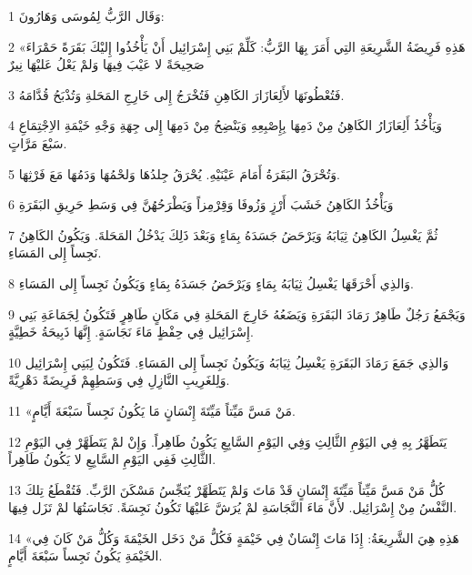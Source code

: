 \par 1 وَقَال الرَّبُّ لِمُوسَى وَهَارُونَ:
\par 2 «هَذِهِ فَرِيضَةُ الشَّرِيعَةِ التِي أَمَرَ بِهَا الرَّبُّ: كَلِّمْ بَنِي إِسْرَائِيل أَنْ يَأْخُذُوا إِليْكَ بَقَرَةً حَمْرَاءَ صَحِيحَةً لا عَيْبَ فِيهَا وَلمْ يَعْلُ عَليْهَا نِيرٌ
\par 3 فَتُعْطُونَهَا لأَلِعَازَارَ الكَاهِنِ فَتُخْرَجُ إِلى خَارِجِ المَحَلةِ وَتُذْبَحُ قُدَّامَهُ.
\par 4 وَيَأْخُذُ أَلِعَازَارُ الكَاهِنُ مِنْ دَمِهَا بِإِصْبِعِهِ وَيَنْضِحُ مِنْ دَمِهَا إِلى جِهَةِ وَجْهِ خَيْمَةِ الاِجْتِمَاعِ سَبْعَ مَرَّاتٍ.
\par 5 وَتُحْرَقُ البَقَرَةُ أَمَامَ عَيْنَيْهِ. يُحْرَقُ جِلدُهَا وَلحْمُهَا وَدَمُهَا مَعَ فَرْثِهَا.
\par 6 وَيَأْخُذُ الكَاهِنُ خَشَبَ أَرْزٍ وَزُوفَا وَقِرْمِزاً وَيَطْرَحُهُنَّ فِي وَسَطِ حَرِيقِ البَقَرَةِ
\par 7 ثُمَّ يَغْسِلُ الكَاهِنُ ثِيَابَهُ وَيَرْحَضُ جَسَدَهُ بِمَاءٍ وَبَعْدَ ذَلِكَ يَدْخُلُ المَحَلةَ. وَيَكُونُ الكَاهِنُ نَجِساً إِلى المَسَاءِ.
\par 8 وَالذِي أَحْرَقَهَا يَغْسِلُ ثِيَابَهُ بِمَاءٍ وَيَرْحَضُ جَسَدَهُ بِمَاءٍ وَيَكُونُ نَجِساً إِلى المَسَاءِ.
\par 9 وَيَجْمَعُ رَجُلٌ طَاهِرٌ رَمَادَ البَقَرَةِ وَيَضَعُهُ خَارِجَ المَحَلةِ فِي مَكَانٍ طَاهِرٍ فَتَكُونُ لِجَمَاعَةِ بَنِي إِسْرَائِيل فِي حِفْظٍ مَاءَ نَجَاسَةٍ. إِنَّهَا ذَبِيحَةُ خَطِيَّةٍ.
\par 10 وَالذِي جَمَعَ رَمَادَ البَقَرَةِ يَغْسِلُ ثِيَابَهُ وَيَكُونُ نَجِساً إِلى المَسَاءِ. فَتَكُونُ لِبَنِي إِسْرَائِيل وَلِلغَرِيبِ النَّازِلِ فِي وَسَطِهِمْ فَرِيضَةً دَهْرِيَّةً.
\par 11 «مَنْ مَسَّ مَيِّتاً مَيِّتَةَ إِنْسَانٍ مَا يَكُونُ نَجِساً سَبْعَةَ أَيَّامٍ.
\par 12 يَتَطَهَّرُ بِهِ فِي اليَوْمِ الثَّالِثِ وَفِي اليَوْمِ السَّابِعِ يَكُونُ طَاهِراً. وَإِنْ لمْ يَتَطَهَّرْ فِي اليَوْمِ الثَّالِثِ فَفِي اليَوْمِ السَّابِعِ لا يَكُونُ طَاهِراً.
\par 13 كُلُّ مَنْ مَسَّ مَيِّتاً مَيِّتَةَ إِنْسَانٍ قَدْ مَاتَ وَلمْ يَتَطَهَّرْ يُنَجِّسُ مَسْكَنَ الرَّبِّ. فَتُقْطَعُ تِلكَ النَّفْسُ مِنْ إِسْرَائِيل. لأَنَّ مَاءَ النَّجَاسَةِ لمْ يُرَشَّ عَليْهَا تَكُونُ نَجِسَةً. نَجَاسَتُهَا لمْ تَزَل فِيهَا.
\par 14 «هَذِهِ هِيَ الشَّرِيعَةُ: إِذَا مَاتَ إِنْسَانٌ فِي خَيْمَةٍ فَكُلُّ مَنْ دَخَل الخَيْمَةَ وَكُلُّ مَنْ كَانَ فِي الخَيْمَةِ يَكُونُ نَجِساً سَبْعَةَ أَيَّامٍ.
